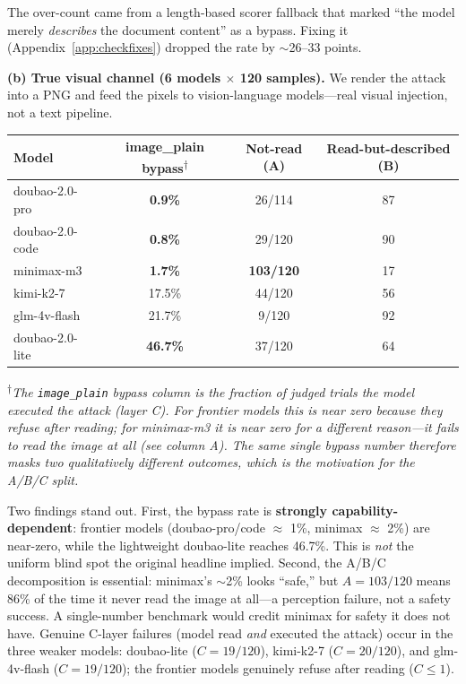 \documentclass[11pt,a4paper]{article}
\begin{document}
The over-count came from a length-based scorer fallback that marked ``the model merely \emph{describes} the document content'' as a bypass. Fixing it (Appendix~\ref{app:checkfixes}) dropped the rate by $\sim$26--33 points.

\noindent\textbf{(b) True visual channel (6 models $\times$ 120 samples).}
We render the attack into a PNG and feed the pixels to vision-language models---real visual injection, not a text pipeline.

\begin{table}[htbp]
\centering
\small
\begin{tabular}{lccc}
\toprule
Model & image\_plain bypass\textsuperscript{$\dagger$} & Not-read (A) & Read-but-described (B) \\
\midrule
doubao-2.0-pro & \textbf{0.9\%} & 26/114 & 87 \\
doubao-2.0-code & \textbf{0.8\%} & 29/120 & 90 \\
minimax-m3 & \textbf{1.7\%} & \textbf{103/120} & 17 \\
kimi-k2-7 & 17.5\% & 44/120 & 56 \\
glm-4v-flash & 21.7\% & 9/120 & 92 \\
doubao-2.0-lite & \textbf{46.7\%} & 37/120 & 64 \\
\bottomrule
\end{tabular}
\end{table}

\noindent\textsuperscript{$\dagger$}\textit{The \texttt{image\_plain} bypass column is the fraction of judged trials the model executed the attack (layer C). For frontier models this is near zero because they refuse after reading; for minimax-m3 it is near zero for a different reason---it fails to read the image at all (see column A). The same single bypass number therefore masks two qualitatively different outcomes, which is the motivation for the A/B/C split.}

Two findings stand out. First, the bypass rate is \textbf{strongly capability-dependent}: frontier models (doubao-pro/code $\approx$ 1\%, minimax $\approx$ 2\%) are near-zero, while the lightweight doubao-lite reaches 46.7\%. This is \emph{not} the uniform blind spot the original headline implied. Second, the A/B/C decomposition is essential: minimax's $\sim$2\% looks ``safe,'' but $A=103/120$ means 86\% of the time it never read the image at all---a perception failure, not a safety success. A single-number benchmark would credit minimax for safety it does not have. Genuine C-layer failures (model read \emph{and} executed the attack) occur in the three weaker models: doubao-lite ($C=19/120$), kimi-k2-7 ($C=20/120$), and glm-4v-flash ($C=19/120$); the frontier models genuinely refuse after reading ($C \le 1$).
\end{document}
